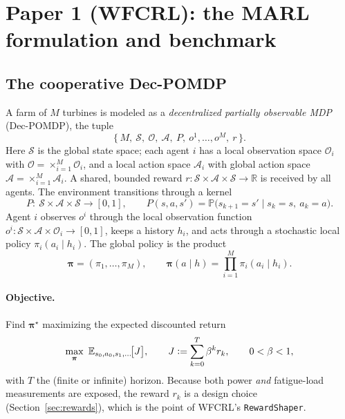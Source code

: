 \documentclass[11pt]{article}
\theoremstyle{plain}
\theoremstyle{definition}
\newcommand{\R}{\mathbb{R}}
\newcommand{\E}{\mathbb{E}}
\newcommand{\Prob}{\mathbb{P}}
\newcommand{\calS}{\mathcal{S}}
\newcommand{\calA}{\mathcal{A}}
\newcommand{\calO}{\mathcal{O}}
\newcommand{\bpi}{\bm{\pi}}
\newcommand{\defeq}{\vcentcolon=}
\begin{document}
\section{Paper 1 (WFCRL): the MARL formulation and benchmark}

\subsection{The cooperative Dec-POMDP}

A farm of $M$ turbines is modeled as a \emph{decentralized partially
observable MDP} (Dec-POMDP), the tuple
\begin{equation}
  \big\{\, M,\ \calS,\ \calO,\ \calA,\ P,\ o^1,\dots,o^M,\ r \,\big\}.
\end{equation}
Here $\calS$ is the global state space; each agent $i$ has a local observation
space $\calO_i$ with $\calO=\times_{i=1}^{M}\calO_i$, and a local action space
$\calA_i$ with global action space $\calA=\times_{i=1}^{M}\calA_i$. A shared,
bounded reward $r:\calS\times\calA\times\calS\to\R$ is received by all agents.
The environment transitions through a kernel
\begin{equation}
  P:\ \calS\times\calA\times\calS \to [0,1], \qquad
  P(s,a,s') = \Prob\big(s_{k+1}=s' \mid s_k=s,\ a_k=a\big).
\end{equation}
Agent $i$ observes $o^i$ through the local observation function
$o^i:\calS\times\calA\times\calO_i\to[0,1]$, keeps a history $h_i$, and acts
through a stochastic local policy $\pi_i(a_i\mid h_i)$. The global policy is
the product
\begin{equation}
  \bpi = (\pi_1,\dots,\pi_M),\qquad
  \bpi(a\mid h) = \prod_{i=1}^M \pi_i(a_i\mid h_i).
\end{equation}

\paragraph{Objective.} Find $\bpi^\star$ maximizing the expected discounted
return
\begin{equation}
  \max_{\bpi}\ \E_{s_0,a_0,s_1,\dots}\!\big[J\big],
  \qquad
  J \defeq \sum_{k=0}^{T}\beta^k r_k,
  \qquad 0<\beta<1,
  \label{eq:objective}
\end{equation}
with $T$ the (finite or infinite) horizon. Because both power \emph{and}
fatigue-load measurements are exposed, the reward $r_k$ is a design choice
(Section~\ref{sec:rewards}), which is the point of WFCRL's \texttt{RewardShaper}.
\end{document}

